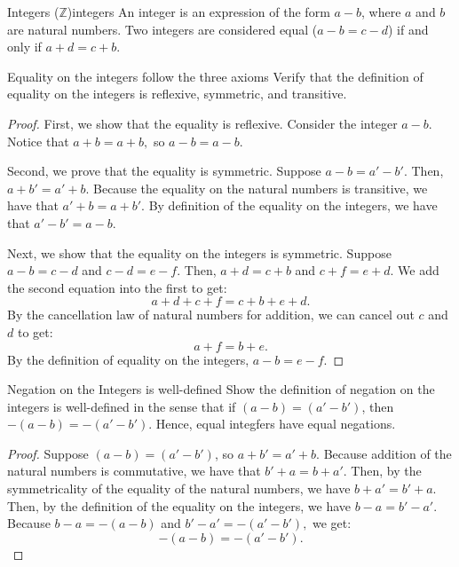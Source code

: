 \begin{definition}{Integers ($\mathbb{Z}$)}{integers}
	An integer is an expression of the form $a \minus b$, where $a$ and $b$ are natural numbers.
	Two integers are considered equal ($a \minus b = c \minus d$) if and only if $a + d = c + b.$
\end{definition}
\begin{problem} {Equality on the integers follow the three axioms}
	Verify that the definition of equality on the integers is reflexive, symmetric, and transitive.
\end{problem}
\begin{proof}
First, we show that the equality is reflexive. Consider the integer $a \minus b.$ 
Notice that $a + b = a + b,$ so $a \minus b = a \minus b.$

Second, we prove that the equality is symmetric. 
Suppose $a \minus b = a' \minus b'$. 
Then, $a + b' = a' + b$. 
Because the equality on the natural numbers is transitive, we have that $a' + b = a + b'$.
By definition of the equality on the integers, we have that $a' \minus b' = a \minus b$.

Next, we show that the equality on the integers is symmetric. 
Suppose $a \minus b = c \minus d$ and $c \minus d = e \minus f$.
Then, $a + d = c + b$ and $c + f = e + d$.
We add the second equation into the first to get:
$$a + d + c + f = c + b + e + d.$$
By the cancellation law of natural numbers for addition, we can cancel out $c$ and $d$ to get:
$$a + f = b + e.$$
By the definition of equality on the integers, $a \minus b = e \minus f$.
\end{proof}

\begin{problem}{Negation on the Integers is well-defined}
Show the definition of negation on the integers is well-defined in the sense that if $(a \minus b) = (a' \minus  b')$, then $-(a \minus b) = -(a' \minus b').$
Hence, equal integfers have equal negations.
\end{problem}
\begin{proof}
Suppose $(a \minus b) = (a' \minus b')$, so $a + b' = a' + b.$ 
Because addition of the natural numbers is commutative, we have that $b' + a = b + a'.$ 
Then, by the symmetricality of the equality of the natural numbers, we have $b + a' = b'+a.$
Then, by the definition of the equality on the integers, we have $b \minus a = b' \minus a'$. 
Because $b \minus a = -(a \minus b)$ and $b' \minus a' = -(a' \minus b'),$ we get:
$$-(a \minus b) = -(a' \minus b').$$
\end{proof}

